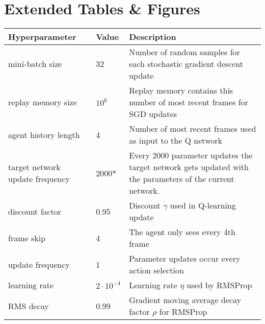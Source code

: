 \chapter{Extended Tables \& Figures}
\label{app:a}

\begin{table}[]
  \vspace{-2cm}
\label{tab:base}
  \renewcommand{\arraystretch}{1.15}
\small
\begin{tabularx}{1.1\linewidth}{ll X}
Hyperparameter                  & Value             & Description                                                                                              \\
  \hline
mini-batch size                 & 32                & Number of random samples for each stochastic gradient descent update                                     \\
replay memory size              & $10^6$            & Replay memory contains this number of most recent frames for SGD updates                                 \\
agent history length            & 4                 & Number of most recent frames used as input to the Q network                                              \\
target network update frequency & 2000*             & Every 2000 parameter updates the target network gets updated with the parameters of the current network. \\
discount factor                 & 0.95              & Discount $\gamma$ used in Q-learning update                                                              \\
frame skip                      & 4                 & The agent only sees every 4th frame                                                                      \\
update frequency                & 1                 & Parameter updates occur every action selection                                                           \\
learning rate                   & $2 \cdot 10^{-4}$ & Learning rate $\eta$ used by RMSProp                                                                     \\
RMS decay                       & 0.99              & Gradient moving average decay factor $\rho$ for RMSProp                                                  \\

\end{tabularx}
\end{table}
